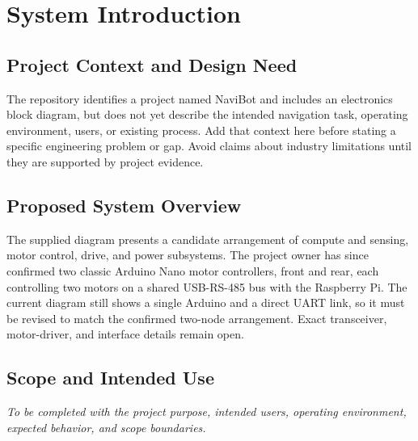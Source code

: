 \section{System Introduction}

\subsection{Project Context and Design Need}
The repository identifies a project named NaviBot and includes an electronics block diagram, but does not yet describe the intended navigation task, operating environment, users, or existing process. Add that context here before stating a specific engineering problem or gap. Avoid claims about industry limitations until they are supported by project evidence.

\subsection{Proposed System Overview}
The supplied diagram presents a candidate arrangement of compute and sensing, motor control, drive, and power subsystems. The project owner has since confirmed two classic Arduino Nano motor controllers, front and rear, each controlling two motors on a shared USB-RS-485 bus with the Raspberry Pi. The current diagram still shows a single Arduino and a direct UART link, so it must be revised to match the confirmed two-node arrangement. Exact transceiver, motor-driver, and interface details remain open.

\subsection{Scope and Intended Use}
\textit{To be completed with the project purpose, intended users, operating environment, expected behavior, and scope boundaries.}
